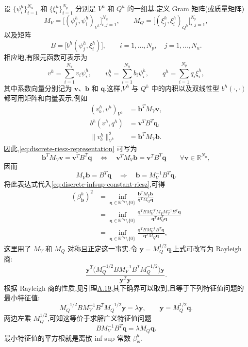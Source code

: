 \begin{note}\label{note:discrete-infsup-generalized-eigenproblem}
设 $\{\psi_i^h\}_{i=1}^{N_u}$ 和 $\{\xi_i^h\}_{i=1}^{N_p}$ 分别是 $V^h$ 和 $Q^h$ 的一组基.定义 Gram 矩阵(或质量矩阵)
\[
  M_V=\bigl[(\psi_j^h,\psi_i^h)_{V^h}\bigr]_{i,j=1}^{N_u},
  \qquad
  M_Q=\bigl[(\xi_j^h,\xi_i^h)_{Q^h}\bigr]_{i,j=1}^{N_p},
\]
以及矩阵
\[
  B=\bigl[b^h(\psi_j^h,\xi_i^h)\bigr],
  \qquad i=1,\ldots,N_p,\quad j=1,\ldots,N_u.
\]
相应地,有限元函数可表示为
\[
  v^h=\sum_{i=1}^{N_u}v_i\psi_i^h,\qquad
  v_b^h=\sum_{i=1}^{N_u}b_i\psi_i^h,\qquad
  q^h=\sum_{i=1}^{N_p}q_i\xi_i^h,
\]
其中系数向量分别记为 $\bm{v}$、$\bm{b}$ 和 $\bm{q}$.这样,$V^h$ 与 $Q^h$ 中的内积以及双线性型 $b^h(\cdot,\cdot)$ 都可用矩阵和向量表示,例如
\[
\begin{aligned}
  (v_b^h,v^h)_{V^h}
    &=\bm{b}^T M_V\bm{v},\\
  b^h(v^h,q^h)
    &=\bm{v}^T B^T\bm{q},\\
  \|v_b^h\|_{V^h}^2
    &=\bm{b}^T M_V\bm{b}.
\end{aligned}
\]
因此,\cref{eq:discrete-riesz-representation} 可写为
\[
  \bm{b}^T M_V\bm{v}
    =\bm{v}^T B^T\bm{q}
  \quad\Longleftrightarrow\quad
  \bm{v}^T M_V\bm{b}
    =\bm{v}^T B^T\bm{q}
  \qquad\forall\bm{v}\in\mathbb{R}^{N_u},
\]
因而
\[
  M_V\bm{b}=B^T\bm{q}
  \quad\Longrightarrow\quad
  \bm{b}=M_V^{-1}B^T\bm{q}.
\]
将此表达式代入\cref{eq:discrete-infsup-constant-riesz},可得
\[
\begin{aligned}
  \left(\beta_{\mathrm{is}}^h\right)^2
   &=\inf_{\bm{q}\in\mathbb{R}^{N_p}\setminus\{0\}}
       \frac{\bm{b}^T M_V\bm{b}}
            {\bm{q}^T M_Q\bm{q}}\\
   &=\inf_{\bm{q}\in\mathbb{R}^{N_p}\setminus\{0\}}
       \frac{\bm{q}^T B M_V^{-T}M_V M_V^{-1}B^T\bm{q}}
            {\bm{q}^T M_Q^T\bm{q}}\\
   &=\inf_{\bm{q}\in\mathbb{R}^{N_p}\setminus\{0\}}
       \frac{\bm{q}^T B M_V^{-1}B^T\bm{q}}
            {\bm{q}^T M_Q\bm{q}},
\end{aligned}
\]
这里用了 $M_V$ 和 $M_Q$ 对称且正定这一事实.令 $\bm{y}=M_Q^{1/2}\bm{q}$,上式可改写为 Rayleigh 商:
\[
  \frac{
    \bm{y}^T
       \bigl(M_Q^{-1/2}B M_V^{-1}B^T M_Q^{-1/2}\bigr)\bm{y}}
       {\bm{y}^T\bm{y}}.
\]
根据 Rayleigh 商的性质,见引理\hyperref[lem:appendix-a-19]{A.19},其下确界可以取到,且等于下列特征值问题的最小特征值:
\[
  M_Q^{-1/2}B M_V^{-1}B^T M_Q^{-1/2}\bm{y}
   =\lambda\bm{y},
  \qquad \bm{y}=M_Q^{1/2}\bm{q}.
\]
两边左乘 $M_Q^{1/2}$,可知这等价于求解广义特征值问题
\begin{equation}\label{eq:generalized-eigenvalue}
  B M_V^{-1}B^T\bm{q}
   =\lambda M_Q\bm{q}.
\end{equation}
最小特征值的平方根就是离散 inf-sup 常数 $\beta_{\mathrm{is}}^h$.
\end{note}

